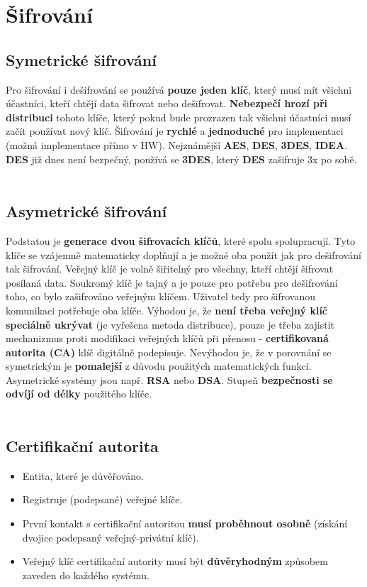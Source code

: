\section{Šifrování}
\subsection{Symetrické šifrování}
Pro šifrování i dešifrování se používá \textbf{pouze jeden klíč}, který musí mít všichni účastníci, kteří chtějí data šifrovat nebo dešifrovat. \textbf{Nebezpečí hrozí při distribuci }tohoto klíče, který pokud bude prozrazen tak všichni účastníci musí začít používat nový klíč.  Šifrování je \textbf{rychlé} a \textbf{jednoduché} pro implementaci (možná implementace přímo v HW). Nejznámější \textbf{AES},	 \textbf{DES}, \textbf{3DES}, \textbf{IDEA}. \textbf{DES} již dnes není bezpečný, používá se \textbf{3DES}, který \textbf{DES} zašifruje 3x po sobě.
\\\\
\noindent{}

\subsection{Asymetrické šifrování}
Podstatou je \textbf{generace dvou šifrovacích klíčů}, které spolu spolupracují. Tyto klíče se vzájemně matematicky doplňují a je možné oba použít jak pro dešifrování tak šifrování. Veřejný klíč je volně šiřitelný pro všechny, kteří chtějí šifrovat posílaná data. Soukromý klíč je tajný a je pouze pro potřebu pro dešifrování toho, co bylo zašifrováno veřejným klíčem. Uživatel tedy pro šifrovanou komunikaci potřebuje oba klíče. Výhodou je, že\textbf{ není třeba veřejný klíč speciálně ukrývat} (je vyřešena metoda distribuce), pouze je třeba zajistit mechanizmus proti modifikaci veřejných klíčů při přenosu - \textbf{certifikovaná autorita (CA)} klíč digitálně podepisuje. Nevýhodou je, že v porovnání se symetrickým je \textbf{pomalejší} z důvodu použitých matematických funkcí. Asymetrické systémy jsou např. \textbf{RSA} nebo \textbf{DSA}. Stupeň \textbf{bezpečnosti se odvíjí od délky} použitého klíče.
\\\\
\noindent{}


\subsection{Certifikační autorita}
\begin{itemize}
    \item Entita, které je důvěřováno.
    \item Registruje (podepsané) veřejné klíče.
    \item První kontakt s certifikační autoritou \textbf{musí proběhnout osobně }(získání dvojice podepsaný veřejný-privátní klíč).
    \item Veřejný klíč certifikační autority musí být \textbf{důvěryhodným} způsobem zaveden do každého systému.
\end{itemize}


